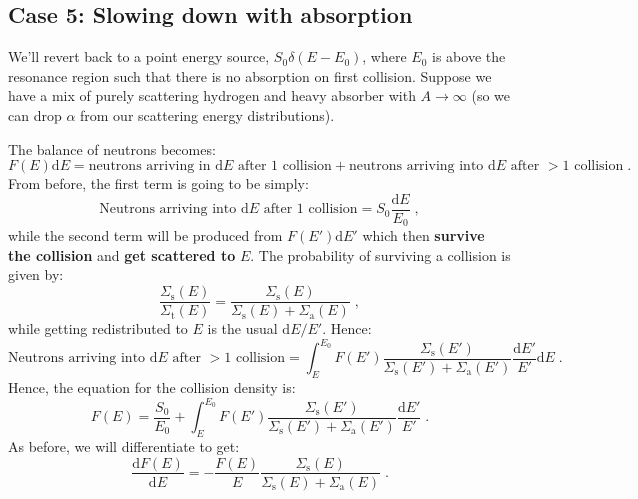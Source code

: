 \subsection{Case 5: Slowing down with absorption}

We'll revert back to a point energy source, $S_0\delta(E-E_0)$, where $E_0$ is above the resonance region such that there is no absorption on first collision. Suppose we have a mix of purely scattering hydrogen and heavy absorber with $A\rightarrow \infty$ (so we can drop $\alpha$ from our scattering energy distributions). 

The balance of neutrons becomes:
\begin{equation*}
    F(E)\mathrm{d}E = \text{neutrons arriving in }\mathrm{d}E\text{ after 1 collision} + \text{neutrons arriving into }\mathrm{d}E\text{ after }>1\text{ collision}\;\mathrm{.}
\end{equation*}
From before, the first term is going to be simply:
\begin{equation*}
    \text{Neutrons arriving into }\mathrm{d}E\text{ after 1 collision} = S_0 \frac{\mathrm{d}E}{E_0}\;\mathrm{,}
\end{equation*}
while the second term will be produced from $F(E')\mathrm{d}E'$ which then \textbf{survive the collision} and \textbf{get scattered to }$E$. The probability of surviving a collision is given by:
\begin{equation*}
    \frac{\Sigma_\mathrm{s}(E)}{\Sigma_\mathrm{t}(E)} = \frac{\Sigma_\mathrm{s}(E)}{\Sigma_\mathrm{s}(E) + \Sigma_\mathrm{a}(E)}\;\mathrm{,}
\end{equation*}
while getting redistributed to $E$ is the usual $\mathrm{d}E/E'$. Hence:
\begin{equation*}
    \text{Neutrons arriving into }\mathrm{d}E\text{ after }>1\text{ collision}= \int^{E_0}_E F(E')\frac{\Sigma_\mathrm{s}(E')}{\Sigma_\mathrm{s}(E') + \Sigma_\mathrm{a}(E')}\frac{\mathrm{d}E'}{E'}\mathrm{d}E\;\mathrm{.}
\end{equation*}
Hence, the equation for the collision density is:
\begin{equation}\label{eq:F_abs}
    F(E) = \frac{S_0}{E_0} + \int^{E_0}_E F(E')\frac{\Sigma_\mathrm{s}(E')}{\Sigma_\mathrm{s}(E') + \Sigma_\mathrm{a}(E')}\frac{\mathrm{d}E'}{E'}\;\mathrm{.}
\end{equation}
As before, we will differentiate to get:
\begin{equation*}
    \frac{\mathrm{d}F(E)}{\mathrm{d}E} = -\frac{F(E)}{E}\frac{\Sigma_\mathrm{s}(E)}{\Sigma_\mathrm{s}(E) + \Sigma_\mathrm{a}(E)}\;\mathrm{.}
\end{equation*}
